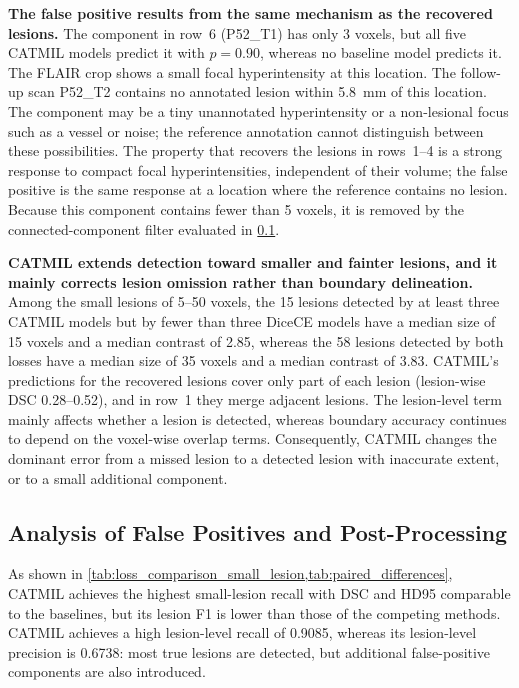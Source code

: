 \textbf{The false positive results from the same mechanism as the recovered
lesions.} The component in row~6 (P52\_T1) has only 3 voxels, but all five
CATMIL models predict it with $p = 0.90$, whereas no baseline model
predicts it. The FLAIR crop shows a small focal hyperintensity at this
location. The follow-up scan P52\_T2 contains no annotated lesion within
5.8~mm of this location. The component may be a tiny unannotated
hyperintensity or a non-lesional focus such as a vessel or noise; the
reference annotation cannot distinguish between these possibilities. The
property that recovers the lesions in rows~1--4 is a strong response to
compact focal hyperintensities, independent of their volume; the false
positive is the same response at a location where the reference contains
no lesion. Because this component contains fewer than 5 voxels, it is
removed by the connected-component filter evaluated in \cref{sec:fp_pp}.

\textbf{CATMIL extends detection toward smaller and fainter lesions, and it
mainly corrects lesion omission rather than boundary delineation.} Among
the small lesions of 5--50 voxels, the 15 lesions detected by at least
three CATMIL models but by fewer than three DiceCE models have a median
size of 15 voxels and a median contrast of 2.85, whereas the 58 lesions
detected by both losses have a median size of 35 voxels and a median
contrast of 3.83. CATMIL's predictions for the recovered lesions cover only
part of each lesion (lesion-wise DSC 0.28--0.52), and in row~1 they merge
adjacent lesions. The lesion-level term mainly affects whether a lesion is
detected, whereas boundary accuracy continues to depend on the voxel-wise
overlap terms. Consequently, CATMIL changes the dominant error from a
missed lesion to a detected lesion with inaccurate extent, or to a small
additional component.

\subsection{Analysis of False Positives and Post-Processing}
\label{sec:fp_pp}

As shown in \cref{tab:loss_comparison_small_lesion,tab:paired_differences},
CATMIL achieves the highest small-lesion recall with DSC and HD95
comparable to the baselines, but its lesion F1 is lower than those of the
competing methods. CATMIL achieves a high
lesion-level recall of 0.9085, whereas its lesion-level precision is
0.6738: most true lesions are detected, but additional false-positive
components are also introduced.

